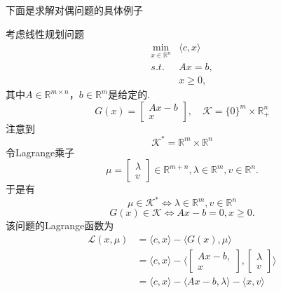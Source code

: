 下面是求解对偶问题的具体例子
\begin{example}
	考虑线性规划问题
	\begin{equation*}
		\begin{split}
			\min\limits_{x\in\mathbb{R}^n}&\langle c, x\rangle\\
			s.t. & Ax = b,\\
			& x\geq 0,
		\end{split}
	\end{equation*}
	其中$A\in\mathbb{R}^{m\times n}$，$b\in\mathbb{R}^m$是给定的.
	\begin{equation*}
		G(x) = \begin{bmatrix}
			Ax-b\\
			x
		\end{bmatrix},\quad
		\mathcal{K} = \{0\}^m \times \mathbb{R}_+^n
	\end{equation*}
	注意到
	\begin{equation*}
		\mathcal{K}^* = \mathbb{R}^m\times \mathbb{R}^n
	\end{equation*}
	令Lagrange乘子
	\begin{equation*}
		\mu = \begin{bmatrix}
			\lambda\\
			v
		\end{bmatrix}\in \mathbb{R}^{m+n},\lambda\in \mathbb{R}^m, v\in \mathbb{R}^n.
	\end{equation*}
	于是有
	\begin{equation*}
		\mu \in \mathcal{K}^*\iff \lambda\in\mathbb{R}^m, v\in \mathbb{R}^n
	\end{equation*}
	\begin{equation*}
		G(x)\in \mathcal{K}\iff Ax-b=0, x\geq 0.
	\end{equation*}
	该问题的Lagrange函数为
	\begin{equation*}
		\begin{split}
			\mathcal{L}(x, \mu) &= \langle c, x\rangle - \langle G(x),\mu\rangle \\
			& = \langle c, x\rangle - \langle \begin{bmatrix}
				Ax-b,\\
				x
			\end{bmatrix},\begin{bmatrix}
				\lambda \\
				 v
			\end{bmatrix} \rangle\\
				& = \langle c, x\rangle - \langle Ax-b, \lambda\rangle - \langle x, v\rangle\\

\end{split}
\end{equation*}
\end{example}
